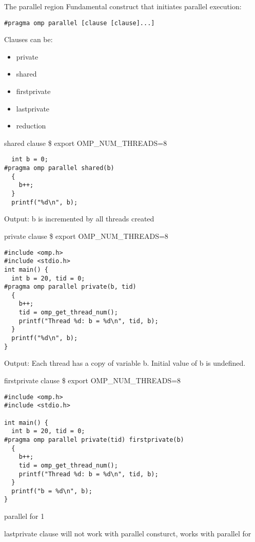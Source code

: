 \documentclass[14pt]{beamer}
\begin{document}
\begin{frame}[fragile]{The parallel region}
Fundamental construct that initiates parallel execution:
\begin{Verbatim}
#pragma omp parallel [clause [clause]...]
\end{Verbatim}
Clauses can be:
\begin{itemize}
\item private
\item shared
\item firstprivate
\item lastprivate
\item reduction
\end{itemize}
\end{frame}

\begin{frame}[fragile]{shared clause}
\$ export OMP\_NUM\_THREADS=8
\begin{Verbatim}
  int b = 0;
#pragma omp parallel shared(b)
  {
    b++;
  }
  printf("%d\n", b);
\end{Verbatim}
Output: b is incremented by all threads created
\end{frame}

\begin{frame}[fragile]{private clause}
\$ export OMP\_NUM\_THREADS=8
\begin{Verbatim}
#include <omp.h>
#include <stdio.h>
int main() {
  int b = 20, tid = 0;
#pragma omp parallel private(b, tid)
  {
    b++;
    tid = omp_get_thread_num();
    printf("Thread %d: b = %d\n", tid, b);
  }
  printf("%d\n", b);
}
\end{Verbatim}
Output: Each thread has a copy of variable b. Initial value of b is undefined.
\end{frame}

\begin{frame}[fragile]{firstprivate clause}
\$ export OMP\_NUM\_THREADS=8
\begin{Verbatim}
#include <omp.h>
#include <stdio.h>

int main() {
  int b = 20, tid = 0;
#pragma omp parallel private(tid) firstprivate(b)
  {
    b++;
    tid = omp_get_thread_num();
    printf("Thread %d: b = %d\n", tid, b);
  }
  printf("b = %d\n", b);
}
\end{Verbatim}
\end{frame}

\begin{frame}[fragile]{parallel for}
1
\end{frame}
\begin{frame}[fragile]{lastprivate clause}
will not work with parallel consturct, works with parallel for
\end{frame}
\end{document}
